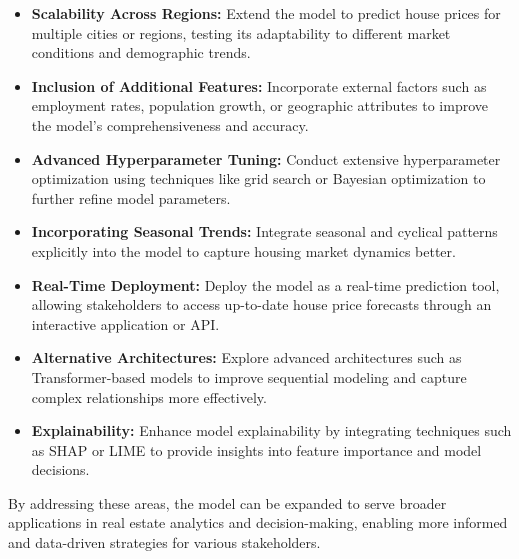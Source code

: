 \begin{itemize}
    \item \textbf{Scalability Across Regions:} Extend the model to predict house prices for multiple cities or regions, testing its adaptability to different market conditions and demographic trends.
    \item \textbf{Inclusion of Additional Features:} Incorporate external factors such as employment rates, population growth, or geographic attributes to improve the model's comprehensiveness and accuracy.
    \item \textbf{Advanced Hyperparameter Tuning:} Conduct extensive hyperparameter optimization using techniques like grid search or Bayesian optimization to further refine model parameters.
    \item \textbf{Incorporating Seasonal Trends:} Integrate seasonal and cyclical patterns explicitly into the model to capture housing market dynamics better.
    \item \textbf{Real-Time Deployment:} Deploy the model as a real-time prediction tool, allowing stakeholders to access up-to-date house price forecasts through an interactive application or API.
    \item \textbf{Alternative Architectures:} Explore advanced architectures such as Transformer-based models to improve sequential modeling and capture complex relationships more effectively.
    \item \textbf{Explainability:} Enhance model explainability by integrating techniques such as SHAP or LIME to provide insights into feature importance and model decisions.
\end{itemize}

By addressing these areas, the model can be expanded to serve broader applications in real estate analytics and decision-making, enabling more informed and data-driven strategies for various stakeholders.
